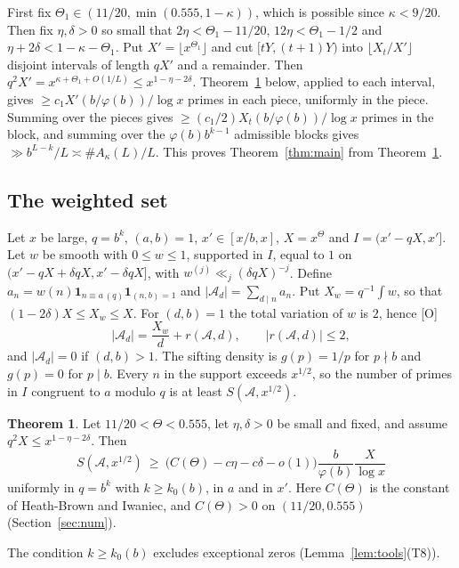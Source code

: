 \documentclass[11pt]{amsart}
\theoremstyle{definition}
\newtheorem{theorem}{Theorem}[section]
\numberwithin{equation}{section}
\newcommand{\cA}{\mathcal{A}}
\begin{document}
First fix $\Theta_1\in(11/20,\min(0.555,1-\kappa))$, which is possible since $\kappa<9/20$. Then fix $\eta,\delta>0$ so small that $2\eta<\Theta_1-11/20$, $12\eta<\Theta_1-1/2$ and $\eta+2\delta<1-\kappa-\Theta_1$. Put $X'=\lfloor x^{\Theta_1}\rfloor$ and cut $[tY,(t+1)Y)$ into $\lfloor X_t/X'\rfloor$ disjoint intervals of length $qX'$ and a remainder. Then $q^2X'=x^{\kappa+\Theta_1+O(1/L)}\le x^{1-\eta-2\delta}$. Theorem~\ref{thm:block} below, applied to each interval, gives $\ge c_1X'(b/\varphi(b))/\log x$ primes in each piece, uniformly in the piece. Summing over the pieces gives $\ge(c_1/2)X_t(b/\varphi(b))/\log x$ primes in the block, and summing over the $\varphi(b)b^{k-1}$ admissible blocks gives $\gg b^{L-k}/L\asymp\#A_\kappa(L)/L$. This proves Theorem~\ref{thm:main} from Theorem~\ref{thm:block}.

\subsection{The weighted set}
Let $x$ be large, $q=b^k$, $(a,b)=1$, $x'\in[x/b,x]$, $X=x^\Theta$ and $I=(x'-qX,x']$. Let $w$ be smooth with $0\le w\le1$, supported in $I$, equal to $1$ on $(x'-qX+\delta qX,x'-\delta qX]$, with $w^{(j)}\ll_j(\delta qX)^{-j}$. Define $a_n=w(n)\mathbf 1_{n\equiv a\,(q)}\mathbf 1_{(n,b)=1}$ and $|\cA_d|=\sum_{d\mid n}a_n$. Put $X_w=q^{-1}\int w$, so that $(1-2\delta)X\le X_w\le X$. For $(d,b)=1$ the total variation of $w$ is $2$, hence [O]
\[
|\cA_d|=\frac{X_w}{d}+r(\cA,d),\qquad|r(\cA,d)|\le2,
\]
and $|\cA_d|=0$ if $(d,b)>1$. The sifting density is $g(p)=1/p$ for $p\nmid b$ and $g(p)=0$ for $p\mid b$. Every $n$ in the support exceeds $x^{1/2}$, so the number of primes in $I$ congruent to $a$ modulo $q$ is at least $S(\cA,x^{1/2})$.

\begin{theorem}\label{thm:block}
Let $11/20<\Theta<0.555$, let $\eta,\delta>0$ be small and fixed, and assume $q^2X\le x^{1-\eta-2\delta}$. Then
\[
S(\cA,x^{1/2})\ \ge\ \bigl(C(\Theta)-c\eta-c\delta-o(1)\bigr)\frac{b}{\varphi(b)}\frac{X}{\log x}
\]
uniformly in $q=b^k$ with $k\ge k_0(b)$, in $a$ and in $x'$. Here $C(\Theta)$ is the constant of Heath-Brown and Iwaniec, and $C(\Theta)>0$ on $(11/20,0.555)$ (Section~\ref{sec:num}).
\end{theorem}

The condition $k\ge k_0(b)$ excludes exceptional zeros (Lemma~\ref{lem:tools}(T8)).
\end{document}
